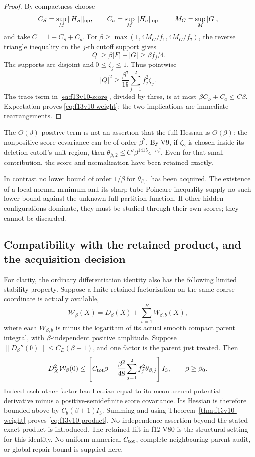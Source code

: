 \documentclass[11pt,oneside]{article}
\begin{document}
\begin{proof}
By compactness choose
\[
 C_S=\sup_M\|H_S\|_{\rm op},\qquad
 C_a=\sup_M\|H_a\|_{\rm op},\qquad
 M_G=\sup_M|G|,
\]
and take \(C=1+C_S+C_a\). For
\(\beta\ge\max(1,4M_G/f_1,4M_G/f_2)\), the reverse
triangle inequality on the \(j\)-th cutoff support gives
\[
 |Q|\ge\beta|F|-|G|\ge\beta f_j/4.
\]
The supports are disjoint and \(0\le\zeta_j\le1\).
Thus pointwise
\[
 |Q|^2\ge\frac{\beta^2}{16}
                              \sum_{j=1}^2f_j^2\zeta_j.
\]
The trace term in \eqref{eq:f13v10-score}, divided by
three, is at most \(\beta C_S+C_a\le C\beta\).
Expectation proves \eqref{eq:f13v10-weight}; the two
implications are immediate rearrangements.
\end{proof}

The \(O(\beta)\) positive term is not an assertion that
the full Hessian is \(O(\beta)\): the nonpositive score
covariance can be of order \(\beta^2\).
By V9, if \(\zeta_2\) is chosen inside its deletion
cutoff's unit region, then
\(\theta_{\beta,2}\le C'\beta^{1415}e^{-\sigma\beta}\).
Even for that small contribution, the score and
normalization have been retained exactly.

In contrast no lower bound of order \(1/\beta\) for
\(\theta_{\beta,1}\) has been acquired. The existence of
a local normal minimum and its sharp tube Poincare
inequality supply no such lower bound against the
unknown full partition function. If other hidden
configurations dominate, they must be studied through
their own scores; they cannot be discarded.

\subsection{Compatibility with the retained product, and the acquisition decision}

For clarity, the ordinary differentiation identity also
has the following limited stability property. Suppose a
finite retained factorization on the same coarse
coordinate is actually available,
\[
 \mathcal W_\beta(X)=D_\beta(X)+\sum_{b=1}^B W_{\beta,b}(X),
\]
where each \(W_{\beta,b}\) is minus the logarithm of
its actual smooth compact parent integral, with
\(\beta\)-independent positive amplitude. Suppose
\(\|D_\beta''(0)\|\le C_D(\beta+1)\), and one factor is
the parent just treated. Then
\begin{equation}\label{eq:f13v10-product}
 D_X^2\mathcal W_\beta(0)
 \le \left[
 C_{\rm tot}\beta-\frac{\beta^2}{48}
                      \sum_{j=1}^2f_j^2\theta_{\beta,j}
 \right]I_3,\qquad \beta\ge\beta_0 .
\end{equation}
Indeed each other factor has Hessian equal to its mean
second potential derivative minus a positive-semidefinite
score covariance. Its Hessian is therefore bounded above
by \(C_b(\beta+1)I_3\). Summing and using
Theorem~\ref{thm:f13v10-weight} proves
\eqref{eq:f13v10-product}. No independence assertion
beyond the stated exact product is introduced.
The retained lift in f12 V80 is the structural setting
for this identity. No uniform numerical \(C_{\rm tot}\),
complete neighbouring-parent audit, or global repair
bound is supplied here.
\end{document}
